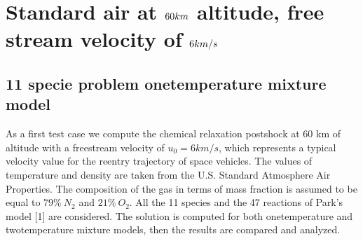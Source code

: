 \documentclass[letterpaper,10pt,english]{jupyterBook}
\begin{document}
\section{Standard air at \protect\(60 km\protect\) altitude, free stream velocity of \protect\(6 km/s\protect\)}
\label{\detokenize{Results/Results:standard-air-at-60-km-altitude-free-stream-velocity-of-6-km-s}}

\subsection{11 specie problem one\sphinxhyphen{}temperature mixture model}
\label{\detokenize{Results/Results:specie-problem-one-temperature-mixture-model}}
\sphinxAtStartPar
As a first test case we compute the chemical relaxation post\sphinxhyphen{}shock at 60 km of altitude with a free\sphinxhyphen{}stream velocity of \(u_0 = 6km/s\), which represents a typical velocity value for the reentry trajectory of space vehicles. The values of temperature and density are taken from the U.S. Standard Atmosphere Air Properties.
The composition of the gas in terms of mass fraction is assumed to be equal to \(79\% \: N_2\) and \(21\% \: O_2\). 
All the 11 species and the 47 reactions of Park’s model {[}1{]} are considered. 
The solution is computed for both one\sphinxhyphen{}temperature and two\sphinxhyphen{}temperature mixture models, then the results are compared and analyzed.
\end{document}
